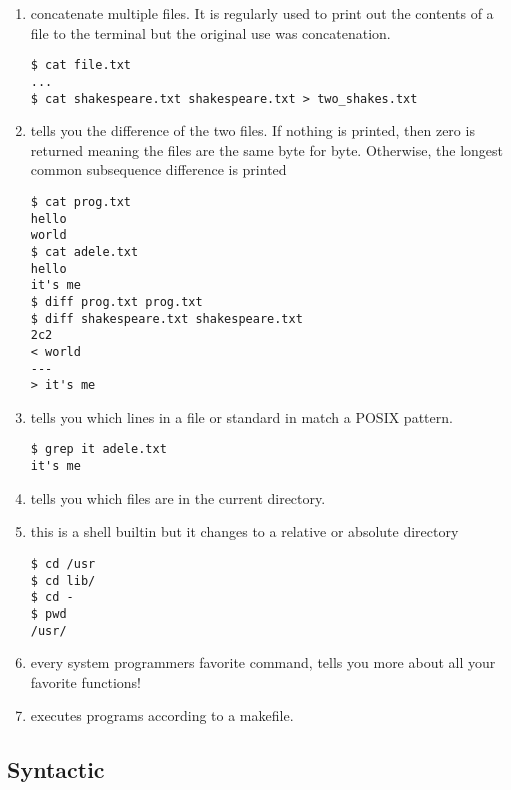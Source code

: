 \begin{enumerate}
\item {} concatenate multiple files. It is regularly used to print out the contents of a file to the terminal but the original use was concatenation.

\begin{lstlisting}[language=console]
$ cat file.txt
...
$ cat shakespeare.txt shakespeare.txt > two_shakes.txt
\end{lstlisting}

\item {} tells you the difference of the two files. If nothing is printed, then zero is returned meaning the files are the same byte for byte. Otherwise, the longest common subsequence difference is printed

\begin{lstlisting}[language=console]
$ cat prog.txt
hello
world
$ cat adele.txt
hello
it's me
$ diff prog.txt prog.txt
$ diff shakespeare.txt shakespeare.txt
2c2
< world
---
> it's me
\end{lstlisting}

\item {} tells you which lines in a file or standard in match a POSIX pattern.

\begin{lstlisting}[language=console]
$ grep it adele.txt
it's me
\end{lstlisting}

\item {} tells you which files are in the current directory.
\item {} this is a shell builtin but it changes to a relative or absolute directory

\begin{lstlisting}[language=console]
$ cd /usr
$ cd lib/
$ cd -
$ pwd
/usr/
\end{lstlisting}

\item {} every system programmers favorite command, tells you more about all your favorite functions!
\item {} executes programs according to a makefile.

\end{enumerate}

\subsection{Syntactic}

